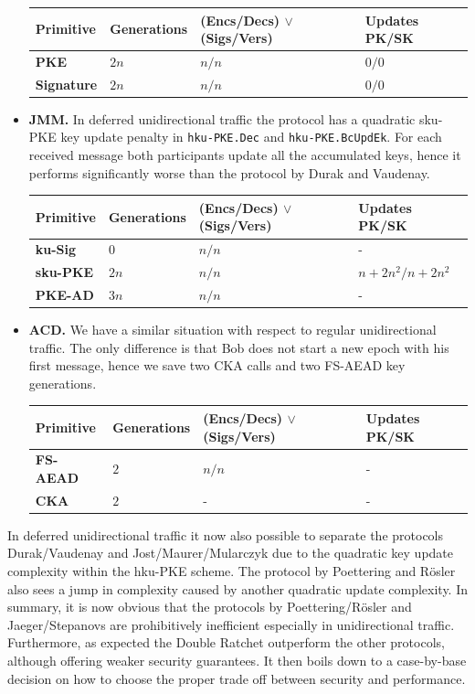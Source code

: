 \documentclass[11pt,a4paper,twoside,openright,bibliography=totoc]{scrbook}
\begin{document}
\begin{itemize}
\begin{center}
    \begin{tabular}{ | l | l | l | l |}
    \hline
    Primitive & Generations & (Encs/Decs) $\vee$ (Sigs/Vers) & Updates PK/SK \\ \hline
    \textbf{PKE} & $2n$ & $n/n$ & $0/0$ \\ \hline
    \textbf{Signature} & $2n$ & $n/n$ & $0/0$ \\  
    \hline
    \end{tabular}
  \end{center}
\item \textbf{JMM.} In deferred unidirectional traffic the protocol
  has a quadratic sku-PKE key update penalty in \texttt{hku-PKE.Dec} and
  \texttt{hku-PKE.BcUpdEk}. For each received message
  both participants update all the accumulated keys, hence it performs
  significantly worse than the protocol by Durak and Vaudenay.
  \begin{center}
    \begin{tabular}{ | l | l | l | l |}
    \hline
    Primitive & Generations & (Encs/Decs) $\vee$ (Sigs/Vers) & Updates PK/SK \\ \hline
    \textbf{ku-Sig} & $0$ & $n/n$ & - \\ \hline
    \textbf{sku-PKE} & $2n$ & $n/n$ & $n+2n^2/n+2n^2$ \\ \hline
    \textbf{PKE-AD} & $3n$ & $n/n$ & - \\
    \hline
    \end{tabular}
  \end{center}
\item \textbf{ACD.} We have a similar situation with respect to regular
  unidirectional traffic. The only difference is that Bob does not
  start a new epoch with his first message, hence we save two CKA calls
  and two FS-AEAD key generations.
  \begin{center}
    \begin{tabular}{ | l | l | l | l |}
    \hline
    Primitive & Generations & (Encs/Decs) $\vee$ (Sigs/Vers) & Updates PK/SK \\ \hline
    \textbf{FS-AEAD} & $2$ & $n/n$ & - \\ \hline
    \textbf{CKA} & $2$ & - & - \\  
    \hline
    \end{tabular}
  \end{center}
\end{itemize}

In deferred unidirectional traffic it now also possible to separate
the protocols Durak/Vaudenay and Jost/Maurer/Mularczyk due to
the quadratic key update complexity within the
hku-PKE scheme. The protocol by Poettering
and Rösler also sees a jump in complexity caused by another
quadratic update complexity. In summary, it is now obvious that
the protocols by Poettering/Rösler and Jaeger/Stepanovs are prohibitively
inefficient especially in unidirectional traffic. Furthermore,
as expected the Double Ratchet outperform the other protocols,
although offering weaker security guarantees. It then boils down
to a case-by-base decision on how to choose the
proper trade off between security and performance.
\end{document}
